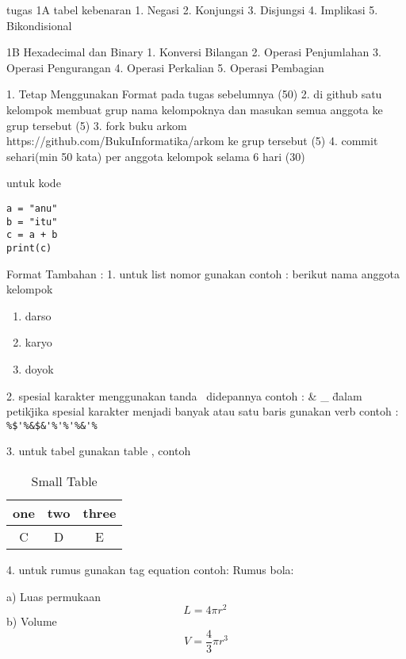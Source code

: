 tugas
1A
tabel kebenaran
1. Negasi
2. Konjungsi
3. Disjungsi
4. Implikasi
5. Bikondisional


1B 
Hexadecimal dan Binary
1. Konversi Bilangan
2. Operasi Penjumlahan
3. Operasi Pengurangan
4. Operasi Perkalian
5. Operasi Pembagian

1. Tetap Menggunakan Format pada tugas sebelumnya (50)
2. di github satu kelompok membuat grup nama kelompoknya dan masukan semua anggota ke grup tersebut (5)
3. fork buku arkom https://github.com/BukuInformatika/arkom ke grup tersebut (5)
4. commit sehari(min 50 kata) per anggota kelompok selama 6 hari (30)


untuk kode
\begin{verbatim}
a = "anu"
b = "itu"
c = a + b
print(c) 
\end{verbatim}




Format Tambahan :
1. untuk list nomor gunakan
	contoh :
	berikut nama anggota kelompok
\begin{enumerate}
	\item darso
	\item karyo
	\item doyok
\end{enumerate}

2. spesial karakter menggunakan tanda \ didepannya
	contoh :
	\&
	\_
	\"dalam petik\"
	jika spesial karakter menjadi banyak atau satu baris gunakan verb
	contoh :
	\verb|%$'%&$&'%'%'%&'%|
	
3. untuk tabel gunakan table , contoh

\begin{table}[h]
\caption{Small Table}
\centering
\begin{tabular}{ccc}
\hline
one&two&three\\
\hline
C&D&E\\
\hline
\end{tabular}
\end{table}

4. untuk rumus gunakan tag equation
	contoh:
	Rumus bola:

	a) Luas permukaan
	 \begin{equation}
	     L = 4 \pi r^2 \,
	\end{equation}
	b) Volume
	 \begin{equation}
	     V = \frac{4}{3}\pi r^3
	\end{equation}